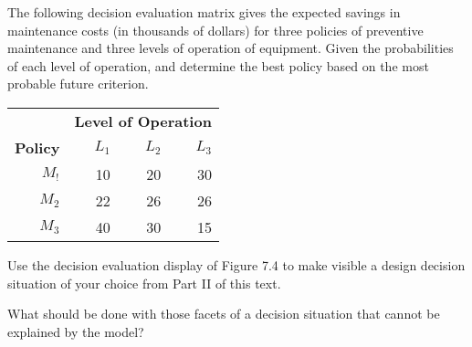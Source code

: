 \begin{exercises}
    \begin{exercise}
    \label{sea-7-43}
        The following decision evaluation matrix gives the expected savings in maintenance costs (in thousands of dollars) for three policies of preventive maintenance and three levels of operation of equipment. Given the probabilities of each level of operation,   and   determine the best policy based on the most probable future criterion.
        \begin{table}[h]
        \centering
        \begin{tabular}{r r r r}
        \toprule
         & \multicolumn{3}{c}{\textbf{Level of Operation}} \\
         \textbf{Policy} & \textbf{$L_1$} & \textbf{$L_2$} & \textbf{$L_3$} \\
        \midrule
        $M_!$ & 10 & 20 & 30 \\
        $M_2$ & 22 & 26 & 26 \\
        $M_3$ & 40 & 30 & 15 \\
        \bottomrule
        \end{tabular}
        \label{tab:sea-7-43} %
        \end{table}
    \end{exercise}
    \begin{solution}
    \end{solution}
    
    \begin{exercise}
    \label{sea-7-44}
        Use the decision evaluation display of Figure 7.4 to make visible a design decision situation of your choice from Part II of this text.
    \end{exercise}
    \begin{solution}
    \end{solution}
    
    \begin{exercise}
    \label{sea-7-45}
        What should be done with those facets of a decision situation that cannot be explained by the model?
    \end{exercise}
    \begin{solution}
    \end{solution}
\end{exercises}
